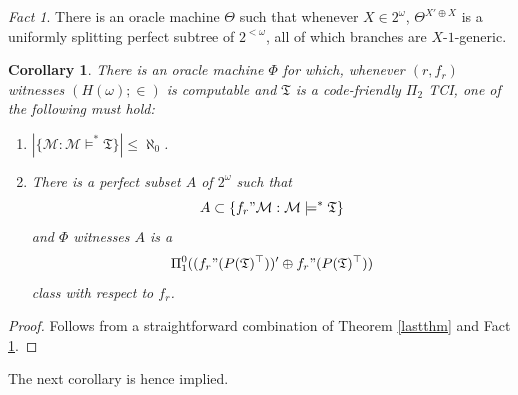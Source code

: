 \documentclass[12pt, twoside]{memoir}
\numberwithin{equation}{section}
\newtheorem{cor}[thm]{Corollary}
\theoremstyle{definition}
\theoremstyle{remark}
\newtheorem{fact}[thm]{Fact}
\theoremstyle{definition}
\theoremstyle{definition}
\theoremstyle{definition}
\theoremstyle{remark}
\begin{document}
\begin{fact}\label{2ndlf}
There is an oracle machine $\Theta$ such that whenever $X \in 2^{\omega}$, $\Theta^{X' \oplus X}$ is a uniformly splitting perfect subtree of $2^{<\omega}$, all of which branches are $X$-$1$-generic.
\end{fact}

\begin{cor}\label{rlcor}
There is an oracle machine $\Phi$ for which, whenever $(r, f_r)$ witnesses $(H(\omega); \in)$ is computable and $\mathfrak{T}$ is a code-friendly $\Pi_2$ TCI, one of the following must hold:
\begin{enumerate}[label=(\arabic*)]
    \item $|\{\mathcal{M} : \mathcal{M} \models^* \mathfrak{T}\}| \leq \aleph_0$.
    \item\label{rlcor2} There is a perfect subset $A$ of $2^{\omega}$ such that $$A \subset \{f_r" \mathcal{M} : \mathcal{M} \models^* \mathfrak{T}\}$$ and $\Phi$ witnesses $A$ is a 
    \begin{equation*}
        \Pi^0_1((f_r" (P(\mathfrak{T})^{\top}))' \oplus f_r" (P(\mathfrak{T})^{\top}))
    \end{equation*}
    class with respect to $f_r$.
\end{enumerate}
\end{cor}

\begin{proof}
Follows from a straightforward combination of Theorem \ref{lastthm} and Fact \ref{2ndlf}.
\end{proof}

The next corollary is hence implied.
\end{document}
